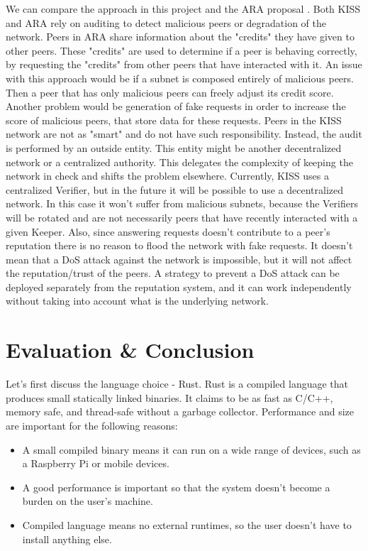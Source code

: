 \documentclass[ twoside,openright,titlepage,numbers=noenddot,headinclude,%
                footinclude=true,cleardoublepage=empty,abstractoff, %
                BCOR=5mm,paper=a4,fontsize=11pt,%
                ngerman,american,%
                ]{scrreprt}
\begin{document}
We can compare the approach in this project and the ARA proposal \cite{ara}.
Both KISS and ARA rely on auditing to detect malicious peers or degradation of the network.
Peers in ARA share information about the "credits" they have given to other peers.
These "credits" are used to determine if a peer is behaving correctly, by requesting the "credits"
from other peers that have interacted with it.
An issue with this approach would be if a subnet is composed entirely of malicious peers.
Then a peer that has only malicious peers can freely adjust its credit score.
Another problem would be generation of fake requests in order to increase the score of malicious peers,
that store data for these requests.
Peers in the KISS network are not as "smart" and do not have such responsibility.
Instead, the audit is performed by an outside entity.
This entity might be another decentralized network or a centralized authority.
This delegates the complexity of keeping the network in check and shifts the problem elsewhere.
Currently, KISS uses a centralized Verifier, but in the future it will be possible to use a decentralized network.
In this case it won't suffer from malicious subnets, because the Verifiers will be rotated and are not necessarily
peers that have recently interacted with a given Keeper.
Also, since answering requests doesn't contribute to a peer's reputation there is no reason to flood the
network with fake requests.
It doesn't mean that a DoS attack against the network is impossible,
but it will not affect the reputation/trust of the peers.
A strategy to prevent a DoS attack can be deployed separately from the reputation system,
and it can work independently without taking into account what is the underlying network.


\chapter{Evaluation \& Conclusion}
\label{cha:evaluation}

Let's first discuss the language choice - Rust.
Rust is a compiled language that produces small statically linked binaries.
It claims to be as fast as C/C++, memory safe, and thread-safe without a garbage collector.
Performance and size are important for the following reasons:
\begin{itemize}
    \item A small compiled binary means it can run on a wide range of devices, such as a Raspberry Pi or mobile devices.
    \item A good performance is important so that the system doesn't become a burden on the user's machine.
    \item Compiled language means no external runtimes, so the user doesn't have to install anything else.
\end{itemize}
\end{document}
